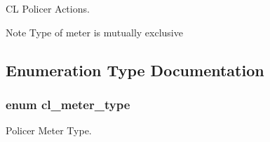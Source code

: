 C\-L Policer Actions. 

\begin{DoxyNote}{Note}
Type of meter is mutually exclusive 
\end{DoxyNote}


\subsection{Enumeration Type Documentation}
\hypertarget{group__FAPI__QOS__CLASS_ga8cedc303de33c7b80f5f7ad0b93e360a}{
\subsubsection[{cl\-\_\-meter\-\_\-type}]{\setlength{\rightskip}{0pt plus 5cm}enum {\bf cl\-\_\-meter\-\_\-type}}}\label{group__FAPI__QOS__CLASS_ga8cedc303de33c7b80f5f7ad0b93e360a}


Policer Meter Type. 

